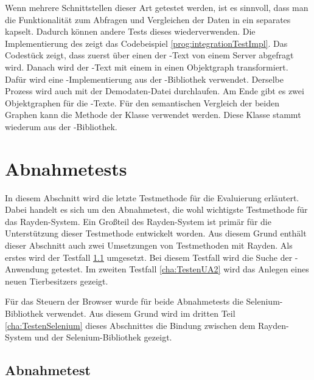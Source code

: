 \SuperPar
Wenn mehrere Schnittstellen dieser Art getestet werden, ist es sinnvoll, dass man die Funktionalität zum Abfragen und Vergleichen der Daten in ein separates  kapselt. Dadurch können andere Tests dieses  wiederverwenden. Die Implementierung des  zeigt das Codebeispiel \ref{prog:integrationTestImpl}. Das Codestück zeigt, dass zuerst über einen  der -Text von einem Server abgefragt wird. Danach wird der -Text mit einem  in einen Objektgraph transformiert. Dafür wird eine -Implementierung aus der -Bibliothek \cite{Guava} verwendet. Derselbe Prozess wird auch mit der Demodaten-Datei durchlaufen. Am Ende gibt es zwei Objektgraphen für die -Texte. Für den semantischen Vergleich der beiden Graphen kann die Methode  der Klasse  verwendet werden. Diese Klasse stammt wiederum aus der -Bibliothek.

\section{Abnahmetests}
\label{cha:TestenUA}

In diesem Abschnitt wird die letzte Testmethode für die Evaluierung erläutert. Dabei handelt es sich um den Abnahmetest, die wohl wichtigste Testmethode für das Rayden-System. Ein Großteil des Rayden-System ist primär für die Unterstützung dieser Testmethode entwickelt worden. Aus diesem Grund enthält dieser Abschnitt auch zwei Umsetzungen von Testmethoden mit Rayden. Als erstes wird der Testfall  \ref{cha:TestenUA1} umgesetzt. Bei diesem Testfall wird die Suche der -Anwendung getestet. Im zweiten Testfall \ref{cha:TestenUA2} wird das Anlegen eines neuen Tierbesitzers gezeigt. 

\SuperPar
Für das Steuern der Browser wurde für beide Abnahmetests die Selenium-Bibliothek verwendet. Aus diesem Grund wird im dritten Teil \ref{cha:TestenSelenium} dieses Abschnittes die Bindung zwischen dem Rayden-System und der Selenium-Bibliothek gezeigt. 


\subsection{Abnahmetest }
\label{cha:TestenUA1}

